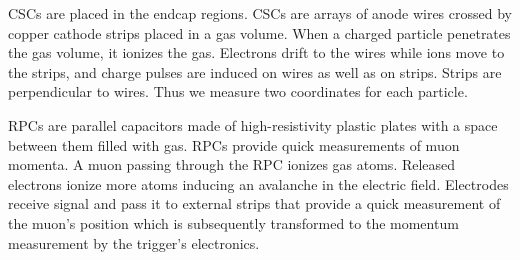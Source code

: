 
CSCs are placed in the endcap regions. CSCs are arrays of anode wires crossed by copper cathode strips placed in a gas volume. When a charged particle penetrates the gas volume, it ionizes the gas. Electrons drift to the wires while ions move to the strips, and charge pulses are induced on wires as well as on strips. Strips are perpendicular to wires. Thus we measure two coordinates for each particle.  

RPCs are parallel capacitors made of high-resistivity plastic plates with a space between them filled with gas. RPCs provide quick measurements of muon momenta. A muon passing through the RPC ionizes gas atoms. Released electrons ionize more atoms inducing an avalanche in the electric field. Electrodes receive signal and pass it to external strips that provide a quick measurement of the muon's position which is subsequently transformed to the momentum measurement by the trigger's electronics. 

